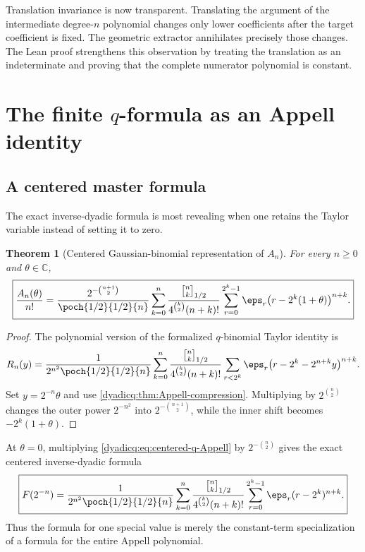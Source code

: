 \documentclass[11pt,oneside]{article}
\newtheorem{theorem}{Theorem}[section]
\theoremstyle{definition}
\theoremstyle{remark}
\newcommand{\C}{\mathbb C}
\newcommand{\qbinom}[3]{\genfrac{[}{]}{0pt}{}{#1}{#2}_{#3}}
\begin{document}
Translation invariance is now transparent.  Translating the argument of the
intermediate degree-$n$ polynomial changes only lower coefficients after the
target coefficient is fixed.  The geometric extractor annihilates precisely
those changes.  The Lean proof strengthens this observation by treating the
translation as an indeterminate and proving that the complete numerator
polynomial is constant.

\section{The finite \texorpdfstring{$q$}{q}-formula as an Appell identity}

\subsection{A centered master formula}

The exact inverse-dyadic formula is most revealing when one retains the Taylor
variable instead of setting it to zero.

\begin{theorem}[Centered Gaussian-binomial representation of $A_n$]
\label{dyadicq:thm:centered-q-Appell}
For every $n\ge0$ and $\theta\in\C$,
\begin{equation}\label{dyadicq:eq:centered-q-Appell}
\boxed{
 \frac{A_n(\theta)}{n!}
 =\frac{2^{-\binom{n+1}{2}}}{\poch{1/2}{1/2}{n}}
 \sum_{k=0}^{n}
 \frac{\qbinom{n}{k}{1/2}}
 {4^{\binom k2}(n+k)!}
 \sum_{r=0}^{2^k-1}
 \eps_r\bigl(r-2^k(1+\theta)\bigr)^{n+k}.}
\end{equation}
\end{theorem}

\begin{proof}
The polynomial version of the formalized $q$-binomial Taylor identity is
\[
 R_n(y)=
 \frac1{2^{n^2}\poch{1/2}{1/2}{n}}
 \sum_{k=0}^{n}
 \frac{\qbinom{n}{k}{1/2}}
 {4^{\binom k2}(n+k)!}
 \sum_{r<2^k}\eps_r
 \bigl(r-2^k-2^{n+k}y\bigr)^{n+k}.
\]
Set $y=2^{-n}\theta$ and use
\cref{dyadicq:thm:Appell-compression}.  Multiplying by $2^{\binom n2}$ changes the
outer power $2^{-n^2}$ into $2^{-\binom{n+1}{2}}$, while the inner shift becomes
$-2^k(1+\theta)$.
\end{proof}

At $\theta=0$, multiplying \eqref{dyadicq:eq:centered-q-Appell} by
$2^{-\binom n2}$ gives the exact centered inverse-dyadic formula
\begin{equation}\label{dyadicq:eq:centered-inverse-dyadic}
 \boxed{
 F(2^{-n})
 =\frac1{2^{n^2}\poch{1/2}{1/2}{n}}
 \sum_{k=0}^{n}
 \frac{\qbinom{n}{k}{1/2}}
 {4^{\binom k2}(n+k)!}
 \sum_{r=0}^{2^k-1}
 \eps_r(r-2^k)^{n+k}.}
\end{equation}
Thus the formula for one special value is merely the constant-term
specialization of a formula for the entire Appell polynomial.
\end{document}
